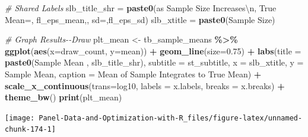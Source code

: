 \documentclass[
]{book}
\newenvironment{Shaded}{\begin{snugshade}}{\end{snugshade}}
\newcommand{\CharTok}[1]{\textcolor[rgb]{0.31,0.60,0.02}{#1}}
\newcommand{\CommentTok}[1]{\textcolor[rgb]{0.56,0.35,0.01}{\textit{#1}}}
\newcommand{\DataTypeTok}[1]{\textcolor[rgb]{0.13,0.29,0.53}{#1}}
\newcommand{\FloatTok}[1]{\textcolor[rgb]{0.00,0.00,0.81}{#1}}
\newcommand{\KeywordTok}[1]{\textcolor[rgb]{0.13,0.29,0.53}{\textbf{#1}}}
\newcommand{\NormalTok}[1]{#1}
\newcommand{\OperatorTok}[1]{\textcolor[rgb]{0.81,0.36,0.00}{\textbf{#1}}}
\newcommand{\StringTok}[1]{\textcolor[rgb]{0.31,0.60,0.02}{#1}}
\begin{document}
\begin{Shaded}
\begin{Highlighting}[]
\CommentTok{\# Shared Labels}
\NormalTok{slb\_title\_shr =}\StringTok{ }\KeywordTok{paste0}\NormalTok{(}\StringTok{\textquotesingle{}as Sample Size Increases}\CharTok{\textbackslash{}n}\StringTok{\textquotesingle{}}\NormalTok{,}
                       \StringTok{\textquotesingle{}True Mean=\textquotesingle{}}\NormalTok{, fl\_eps\_mean,}\StringTok{\textquotesingle{}, sd=\textquotesingle{}}\NormalTok{,fl\_eps\_sd)}
\NormalTok{slb\_xtitle =}\StringTok{ }\KeywordTok{paste0}\NormalTok{(}\StringTok{\textquotesingle{}Sample Size\textquotesingle{}}\NormalTok{)}

\CommentTok{\# Graph Results{-}{-}Draw}
\NormalTok{plt\_mean \textless{}{-}}\StringTok{ }\NormalTok{tb\_sample\_means }\OperatorTok{\%\textgreater{}\%}
\StringTok{  }\KeywordTok{ggplot}\NormalTok{(}\KeywordTok{aes}\NormalTok{(}\DataTypeTok{x=}\NormalTok{draw\_count, }\DataTypeTok{y=}\NormalTok{mean)) }\OperatorTok{+}
\StringTok{  }\KeywordTok{geom\_line}\NormalTok{(}\DataTypeTok{size=}\FloatTok{0.75}\NormalTok{) }\OperatorTok{+}
\StringTok{  }\KeywordTok{labs}\NormalTok{(}\DataTypeTok{title =} \KeywordTok{paste0}\NormalTok{(}\StringTok{\textquotesingle{}Sample Mean \textquotesingle{}}\NormalTok{, slb\_title\_shr),}
       \DataTypeTok{subtitle =}\NormalTok{ st\_subtitle,}
       \DataTypeTok{x =}\NormalTok{ slb\_xtitle,}
       \DataTypeTok{y =} \StringTok{\textquotesingle{}Sample Mean\textquotesingle{}}\NormalTok{,}
       \DataTypeTok{caption =} \StringTok{\textquotesingle{}Mean of Sample Integrates to True Mean\textquotesingle{}}\NormalTok{) }\OperatorTok{+}
\StringTok{  }\KeywordTok{scale\_x\_continuous}\NormalTok{(}\DataTypeTok{trans=}\StringTok{\textquotesingle{}log10\textquotesingle{}}\NormalTok{, }\DataTypeTok{labels =}\NormalTok{ x.labels, }\DataTypeTok{breaks =}\NormalTok{ x.breaks) }\OperatorTok{+}
\StringTok{  }\KeywordTok{theme\_bw}\NormalTok{()}
\KeywordTok{print}\NormalTok{(plt\_mean)}
\end{Highlighting}
\end{Shaded}

\begin{center}\texttt{[image: Panel-Data-and-Optimization-with-R\_files/figure-latex/unnamed-chunk-174-1]} \end{center}
\end{document}
